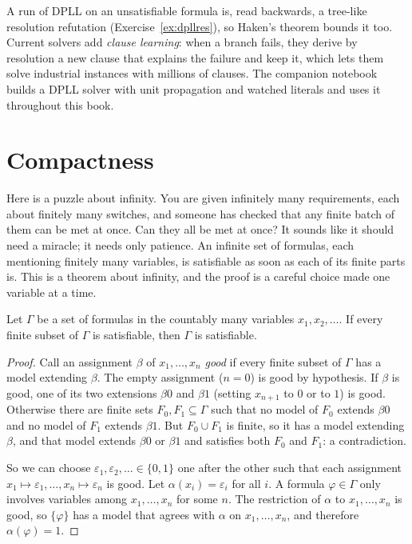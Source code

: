 A run of DPLL on an unsatisfiable formula is, read backwards, a tree-like resolution refutation (Exercise~\ref{ex:dpllres}), so
Haken's theorem bounds it too. Current solvers add \emph{clause learning}: when a branch fails, they derive by resolution a
new clause that explains the failure and keep it, which lets them solve industrial instances with millions of clauses.
The companion notebook builds a DPLL solver with unit propagation and watched literals and uses it throughout this book.

\section{Compactness}

Here is a puzzle about infinity. You are given infinitely many requirements, each about finitely many switches, and
someone has checked that any finite batch of them can be met at once. Can they all be met at once? It sounds like it
should need a miracle; it needs only patience. An infinite set of formulas, each mentioning finitely many variables, is satisfiable as soon as each of its finite
parts is. This is a theorem about infinity, and the proof is a careful choice made one variable at a time.

\begin{theorem}[compactness]\label{thm:compactness}
Let $\Gamma$ be a set of formulas in the countably many variables $x_1,x_2,\dots$. If every finite subset of $\Gamma$ is satisfiable, then
$\Gamma$ is satisfiable.
\end{theorem}
\begin{proof}
Call an assignment $\beta$ of $x_1,\dots,x_n$ \emph{good} if every finite subset of $\Gamma$ has a model extending $\beta$. The empty assignment
($n=0$) is good by hypothesis. If $\beta$ is good, one of its two extensions $\beta0$ and $\beta1$ (setting $x_{n+1}$ to $0$ or to $1$) is good. Otherwise there
are finite sets $F_0,F_1\subseteq\Gamma$ such that no model of $F_0$ extends $\beta0$ and no model of $F_1$ extends $\beta1$. But $F_0\cup F_1$ is finite, so it has a
model extending $\beta$, and that model extends $\beta0$ or $\beta1$ and satisfies both $F_0$ and $F_1$: a contradiction.

So we can choose $\varepsilon_1,\varepsilon_2,\ldots\in\{0,1\}$ one after the other such that each assignment $x_1\mapsto\varepsilon_1,\dots,x_n\mapsto\varepsilon_n$ is good. Let
$\alpha(x_i)=\varepsilon_i$ for all $i$. A formula $\varphi\in\Gamma$ only involves variables among $x_1,\dots,x_n$ for some $n$. The restriction of $\alpha$ to $x_1,\dots,x_n$
is good, so $\{\varphi\}$ has a model that agrees with $\alpha$ on $x_1,\dots,x_n$, and therefore $\alpha(\varphi)=1$.
\end{proof}

